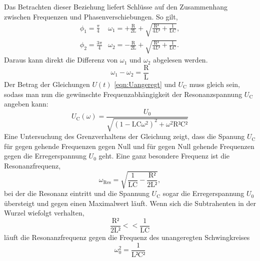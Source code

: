 \documentclass[titlepage = firstcover]{scrartcl}
\begin{document}
            Das Betrachten dieser Beziehung liefert Schlüsse auf den Zusammenhang zwischen Frequenzen und Phasenverschiebungen. So gilt,
            \begin{align}
                \phi_1 = \frac{\pi}{4}  & \omega_1 = + \frac{\text{R}}{\text{2L}} + \sqrt{\frac{\text{R²}}{4L²} + \frac{1}{\text{LC}}}, \\
                \phi_2 = \frac{3\pi}{4} & \omega_2 = - \frac{\text{R}}{\text{2L}} + \sqrt{\frac{\text{R²}}{4L²} + \frac{1}{\text{LC}}}.
                \label{eqn:freq}
            \end{align}
            Daraus kann direkt die Differenz von $\omega_1$ und $\omega_2$ abgelesen werden.
            \begin{equation}
                \omega_1 - \omega_2 = \frac{\text{R}}{\text{L}}
                \label{eqn:w1-w2}
            \end{equation}
            Der Betrag der Gleichungen $U(t)$ \ref{eqn:Uangeregt} und $U_{\text{C}}$ muss gleich sein, sodass man nun die gewünschte Frequenzabhängigkeit
            der Resonanzspannung $U_{\text{C}}$ angeben kann:
            \begin{equation}
                U_{\text{C}}(\omega) = \frac{U_0}{\sqrt{\left(1-\text{LC}\omega^2\right)^2 + \omega^2\text{R²C²}}}
                \label{eqn:Uvonw}
            \end{equation}  
            Eine Untersuchung des Grenzverhaltens der Gleichung zeigt, dass die Spanung $U_{\text{C}}$ für gegen \infty gehende Frequenzen gegen Null und für
            gegen Null gehende Frequenzen gegen die Erregerspannung $U_0$ geht. Eine ganz besondere Frequenz ist die Resonanzfrequenz,
            \begin{equation}
                \omega_{\text{Res}} = \sqrt{\frac{1}{\text{LC}}-\frac{\text{R²}}{\text{2L²}}},
                \label{eqn:Resonanzfreq}
            \end{equation}
            bei der die Resonanz eintritt und die Spannung $U_{\text{C}}$ sogar die Erregerspannung $U_0$ übersteigt und gegen einen Maximalwert läuft.
            Wenn sich die Subtrahenten in der Wurzel wiefolgt verhalten,
            \begin{equation*}
                \frac{\text{R²}}{\text{2L²}} << \frac{1}{\text{LC}}
            \end{equation*} 
            läuft die Resonanzfrequenz gegen die Frequenz des unangeregten Schwingkreises
            \begin{equation*}
                \omega_0^2 = \frac{1}{\text{L²C²}}
            \end{equation*}
\end{document}
